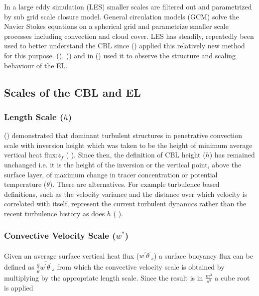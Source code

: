 In a large eddy simulation (\acs{LES}) smaller scales are filtered out and parametrized by sub grid scale closure model. General circulation models (\acs{GCM}) solve the Navier Stokes equations on a spherical grid and parametrize smaller scale processes including convection and cloud cover.  \acs{LES} has steadily, repeatedly been used to better understand the \acs{CBL} since \citeauthor{Deardorff72} (\citeyear{Deardorff72}) applied this relatively new method for this purpose.  \citeauthor{SullMoengStev} (\citeyear{SullMoengStev}), \citeauthor{FedConzMir04} (\citeyear{FedConzMir04}) and \citeauthor{BrooksFowler2} in (\citeyear{BrooksFowler2}) used it to observe the structure and scaling behaviour of the \acs{EL}.\\

\subsection{Scales of the \acs{CBL} and \acs{EL}}
\label{subsec:scales}

\subsubsection{Length Scale ($h$)}
\label{subsubsec:}

\citeauthor{Deardorff72} (\citeyear{Deardorff72}) demonstrated that dominant turbulent structures in penetrative convection
scale with inversion height which was taken to be the height of minimum average vertical heat flux:$z_{f}$ 
(\citeauthor{DearWill80} \citeyear{DearWill80}).  Since then, the definition of \acs{CBL} height ($h$) has 
remained  unchanged i.e. it is the height of the inversion or the vertical point,
above the surface layer, of maximum change in tracer concentration or potential temperature ($\theta$). There are
alternatives. For example turbulence based definitions, such as the velocity variance and the distance over which 
velocity is correlated with itself, represent the current turbulent dynamics rather than the recent turbulence history
as does $h$ (\citeauthor{Traum11} \citeyear{Traum11}).\\

\subsubsection{Convective Velocity Scale ($w^{*}$)}
\label{subsubsec:convel}

Given an average surface vertical heat flux ($\overline{w^{'}\theta^{'}}_{s}$) a surface buoyancy flux can be defined as 
$\frac{g}{\overline{\theta}}\overline{w^{'}\theta^{'}}_{s}$ from which the convective velocity scale is obtained by
multiplying by the appropriate length scale.  Since the result is in $\frac{m^{3}}{s^{3}}$ a cube root is applied\\


